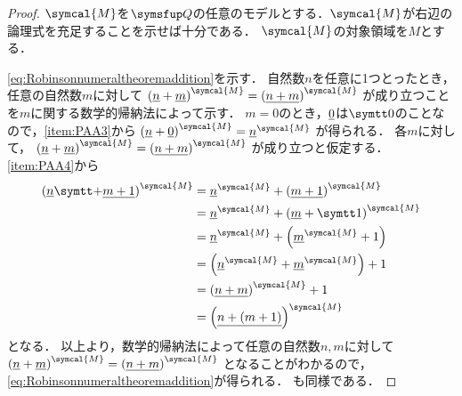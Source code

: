 \begin{proof}
	\(\symcal{M}\)を\(\Robinson\)の任意のモデルとする．\(\symcal{M}\)が右辺の論理式を充足することを示せば十分である．
	\(\symcal{M}\)の対象領域を\(M\)とする．

	\cref{eq:Robinsonnumeraltheoremaddition}を示す．
	自然数\(n\)を任意に1つとったとき，
	任意の自然数\(m\)に対して
	\(
	\interpretation{\symcal{M}}{\paren{\numeral{n} + \numeral{m}}} = \interpretation{\symcal{M}}{\paren{\numeral{n + m}}}
	\)
	が成り立つことを\(m\)に関する数学的帰納法によって示す．
	\(m = 0\)のとき，\(\underline{0}\)は\(\obj{0}\)のことなので，\cref{item:PAA3}から
	\(
	\interpretation{\symcal{M}}{\paren{\numeral{n} + \numeral{0}}} = \interpretation{\symcal{M}}{\numeral{n}}
	\)
	が得られる．
	各\(m\)に対して，
	\(
	\interpretation{\symcal{M}}{\paren{\numeral{n} + \numeral{m}}} = \interpretation{\symcal{M}}{\paren{\numeral{n + m}}}
	\)
	が成り立つと仮定する．
	\cref{item:PAA4}から
	\begin{align*}
		\interpretation{\symcal{M}}{\paren{\numeral{n} \obj{+} \numeral{m + 1}}}
		 & = \interpretation{\symcal{M}}{\numeral{n}} + \interpretation{\symcal{M}}{\paren{\numeral{m + 1}}}       \\
		 & = \interpretation{\symcal{M}}{\numeral{n}} + \interpretation{\symcal{M}}{\paren{\numeral{m} + \obj{1}}} \\
		 & = \interpretation{\symcal{M}}{\numeral{n}} + \paren{\interpretation{\symcal{M}}{\numeral{m}} + 1}       \\
		 & = \paren{\interpretation{\symcal{M}}{\numeral{n}} + \interpretation{\symcal{M}}{\numeral{m}}} + 1       \\
		 & = \interpretation{\symcal{M}}{\paren{\numeral{n + m}}}  + 1                                             \\
		 & = \interpretation{\symcal{M}}{\paren{\numeral{n + \paren{m + 1}}}}
	\end{align*}
	となる．
	以上より，数学的帰納法によって任意の自然数\(n, m\)に対して
	\(
	\interpretation{\symcal{M}}{\paren{\numeral{n} + \numeral{m}}} = \interpretation{\symcal{M}}{\paren{\numeral{n + m}}}
	\)
	となることがわかるので，\cref{eq:Robinsonnumeraltheoremaddition}が得られる．
	も同様である．


\end{proof}
